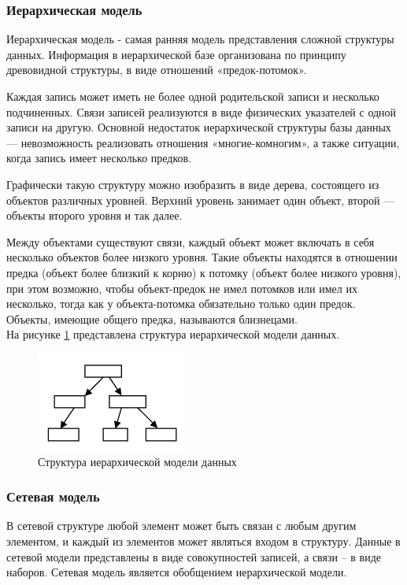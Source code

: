 \documentclass[12pt,a4paper,oneside]{report}
\begin{document}
\subsubsection{Иерархическая модель}
\quad Иерархическая модель - самая ранняя модель представления сложной структуры данных. Информация в иерархической базе организована по принципу древовидной структуры, в виде отношений «предок-потомок».

Каждая запись может иметь не более одной родительской записи и несколько подчиненных. Связи записей реализуются в виде физических указателей с одной записи на другую. Основной недостаток иерархической структуры базы данных — невозможность реализовать отношения «многие-комногим», а также ситуации, когда запись имеет несколько предков.

Графически такую структуру можно изобразить в виде дерева, состоящего из объектов различных уровней. Верхний уровень занимает один объект, второй — объекты второго уровня и так далее.

Между объектами существуют связи, каждый объект может включать в себя несколько объектов более низкого уровня. Такие объекты находятся в отношении предка (объект более близкий к корню) к потомку (объект более низкого уровня), при этом возможно, чтобы объект-предок не имел потомков или имел их несколько, тогда как у объекта-потомка обязательно только один предок. Объекты, имеющие общего предка, называются близнецами\cite{ierarh}.\\

На рисунке \ref{ris:rarh} представлена структура иерархической модели данных.
\begin{figure}[h]
	\centering
	\includegraphics[scale=1]{1.png}
	\caption{Структура иерархической модели данных}
	\label{ris:rarh}
\end{figure}

\subsubsection{Сетевая модель}
\quad В сетевой структуре любой элемент может быть связан с любым другим элементом, и каждый из элементов может являться входом в структуру. Данные в сетевой модели представлены в виде совокупностей записей, а связи – в виде наборов. Сетевая модель является обобщением иерархической модели.
\end{document}
